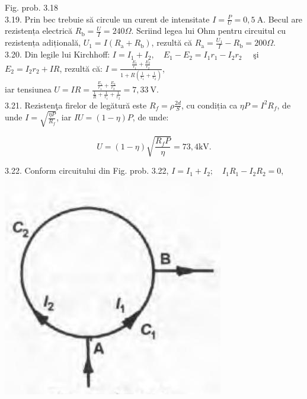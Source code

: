 \documentclass[10pt]{article}
\begin{document}
Fig. prob. 3.18\\
3.19. Prin bec trebuie să circule un curent de intensitate $I=\frac{P}{U}=0,5 \mathrm{~A}$. Becul are rezistența electrică $R_{\mathrm{b}}=\frac{U}{I}=240 \Omega$. Scriind legea lui Ohm pentru circuitul cu rezistența adițională, $U_{1}=I\left(R_{\mathrm{a}}+R_{\mathrm{b}}\right)$, rezultă că $R_{\mathrm{a}}=\frac{U_{1}}{I}-R_{\mathrm{b}}=200 \Omega$.\\
3.20. Din legile lui Kirchhoff: $I=I_{1}+I_{2}, \quad E_{1}-E_{2}=I_{1} r_{1}-I_{2} r_{2} \quad$ şi $E_{2}=I_{2} r_{2}+I R$, rezultă că: $I=\frac{\frac{E_{1}}{r_{1}}+\frac{E_{2}}{r_{2}}}{1+R\left(\frac{1}{r_{1}}+\frac{1}{r_{2}}\right)}$,\\
iar tensiunea $U=I R=\frac{\frac{E_{1}}{r_{1}}+\frac{E_{2}}{r_{2}}}{\frac{1}{R}+\frac{1}{r_{1}}+\frac{1}{r_{2}}}=7,33 \mathrm{~V}$.\\
3.21. Rezistenţa firelor de legătură este $R_{f}=\rho \frac{2 d}{S}$, cu condiția ca $\eta P=I^{2} R_{f}$, de unde $I=\sqrt{\frac{\eta P}{R_{f}}}$, iar $I U=(1-\eta) P$, de unde:

$$
U=(1-\eta) \sqrt{\frac{R_{f} P}{\eta}}=73,4 \mathrm{kV} .
$$

3.22. Conform circuitului din Fig. prob. 3.22, $I=I_{1}+I_{2} ; \quad I_{1} R_{1}-I_{2} R_{2}=0$,\\
\includegraphics[max width=\textwidth, center]{2025_07_01_5b3ff9fa0d508c8e9f17g-345}
\end{document}
